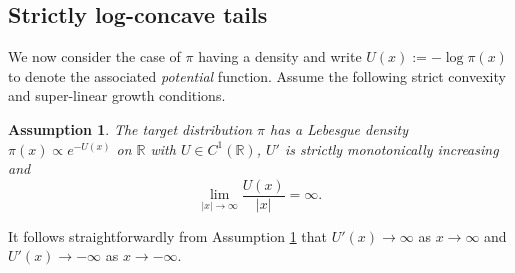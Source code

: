 \documentclass{article}
\theoremstyle{definition}
\theoremstyle{plain}
\newtheorem{assumption}{Assumption}[section]
\newtheorem{proposition}[definition]{Proposition}
\begin{document}
\subsection{Strictly log-concave tails}
\label{subsec:light_tailed_target}

We now consider the case of $\pi$ having a density and write $U(x) := -\log\pi(x)$ to denote the associated \textit{potential} function.  Assume the following strict convexity and super-linear growth conditions.
\begin{assumption}
\label{ass:strict_convexity}
    The target distribution $\pi$ has a Lebesgue density $\pi(x) \propto e^{-U(x)}$ on $\mathbb{R}$ with $U \in C^1(\mathbb{R})$, $U'$ is strictly monotonically increasing and
    \begin{equation*}
    \lim_{|x| \to \infty}\frac{U(x)}{|x|} = \infty.
    \end{equation*}
\end{assumption} 
It follows straightforwardly from Assumption \ref{ass:strict_convexity} that $U'(x) \to \infty$ as $x \to \infty$ and $U'(x) \to -\infty$ as $x \to -\infty$.


\end{document}
